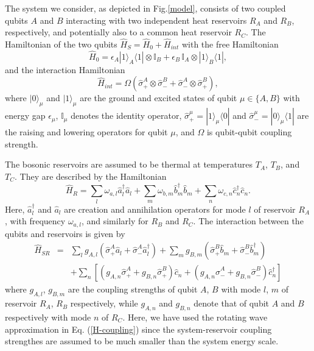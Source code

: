 \documentclass[12pt]{iopart}
\newcommand{\bra}[1]{\langle#1|}
\newcommand{\ket}[1]{|#1\rangle}
\begin{document}
The system we consider, as depicted in Fig.\ref{model}, consists of two coupled qubits $A$ and $B$ interacting with two independent heat reservoirs $R_{A}$ and $R_{B}$, respectively, and potentially also to a common heat reservoir $R_{C}$. The Hamiltonian of the two qubits $ \hat{H}_{S}=\hat{H}_{0}+\hat{H}_{int} $ with the free Hamiltonian
\begin{equation}\label{H0}
\hat{H}_{0} = \epsilon_{A}\ket{1}_{A}\bra{1} \otimes \mathbb{I}_{B} + \epsilon_{B}\, \mathbb{I}_{A}\otimes \ket{1}_{B}\bra{1} ,
\end{equation}
and the interaction Hamiltonian
\begin{equation}\label{Hint}
\hat{H}_{int} = \Omega \left( \hat{\sigma}_{+}^{A}\otimes\hat{\sigma}_{-}^{B} + \hat{\sigma}_{-}^{A}\otimes\hat{\sigma}_{+}^{B} \right),
\end{equation}
where $\ket{0}_{\mu}$ and $\ket{1}_{\mu}$ are the ground and excited states of qubit $\mu \in\{A,B\}$ with energy gap $\epsilon_{\mu}$, $\mathbb{I}_{\mu}$ denotes the identity operator, $\hat{\sigma}_{+}^{\mu}=\ket{1}_{\mu}\bra{0}$ and $\hat{\sigma}_{-}^{\mu} = \ket{0}_{\mu}\bra{1}$ are the raising and lowering operators for qubit $\mu$, and $\Omega$ is qubit-qubit coupling strength.

The bosonic reservoirs are assumed to be thermal at temperatures $T_A$, $T_B$, and $T_C$. They are described by the Hamiltonian
\begin{equation}\label{H-reservoir}
\hat{H}_{R} = \sum_{l}\omega_{a,l}\hat{a}_{l}^{\dag}\hat{a}_{l} + \sum_{m}\omega_{b,m}\hat{b}_{m}^{\dag}\hat{b}_{m} + \sum_{n}\omega_{c,n}\hat{c}_{n}^{\dag}\hat{c}_{n} .
\end{equation}
Here, $\hat{a}_{l}^{\dag}$ and $\hat{a}_{l}$ are creation and annihilation operators for mode $l$ of reservoir $R_A$, with frequency $\omega_{a,l}$, and similarly for $R_B$ and $R_C$. The interaction between the qubits and reservoirs is given by
\begin{eqnarray}
\label{H-coupling}
\hat{H}_{SR} &=& \sum_{l}g_{A,l}\left(\hat{\sigma}_{+}^{A}\hat{a}_{l}+\hat{\sigma}_{-}^{A}\hat{a}_{l}^{\dag}\right)
+\sum_{m}g_{B,m}\left(\hat{\sigma}_{+}^{B}\hat{b}_{m}+\hat{\sigma}_{-}^{B}\hat{b}_{m}^{\dag}\right) \nonumber\\
&&+\sum_{n}\left[\left(g_{A,n}\hat{\sigma}_{+}^{A}+g_{B,n}\hat{\sigma}_{+}^{B}\right)\hat{c}_{n}+
\left(g_{A,n}\hat{\sigma}_{-}^{A}+g_{B,n}\hat{\sigma}_{-}^{B}\right)\hat{c}_{n}^{\dag}\right]
\end{eqnarray}
where $g_{A,l}$, $g_{B,m}$ are the coupling strengths of qubit $A$, $B$ with mode $l$, $m$ of reservoir $R_{A}$, $R_{B}$ respectively, while $g_{A,n}$ and $g_{B,n}$ denote that of qubit $A$ and $B$ respectively with mode $n$ of $R_{C}$. Here, we have used the rotating wave approximation in Eq. (\ref{H-coupling}) since the system-reservoir coupling strengthes are assumed to be much smaller than the system energy scale.
\end{document}
